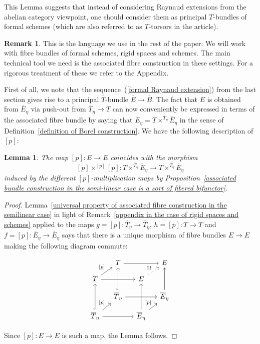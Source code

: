 \documentclass[10pt,oneside]{amsart}
\newtheorem{lemma}[theorem]{Lemma}
\theoremstyle{definition}
\newtheorem{remark}[theorem]{Remark}
\begin{document}
	This Lemma suggests that instead of considering Raynaud extensions from the abelian category viewpoint, one should consider them as principal $T$-bundles of formal schemes (which are also referred to as $T$-torsors in the article). 
	
	\begin{remark}
	This is the language we use in the rest of the paper: We will work with fibre bundles of formal schemes, rigid spaces and schemes. The main technical tool we need is the associated fibre construction in these settings. For a rigorous  treatment of these we refer to the Appendix.
	\end{remark}
	
	First of all, we note that the sequence~(\ref{formal Raynaud extension}) from the last section gives rise to a principal $\overline{T}$-bundle
	$\overline{E}\rightarrow \overline{B}$. The fact that $E$ is obtained from $\overline{E}_\eta$ via push-out from $\overline{T}_\eta\rightarrow T$ can now conveniently be expressed in terms of the associated fibre bundle by saying that $E_\eta = T\times^{\overline{T}_\eta}\overline{E}_\eta$ in the sense of Definition~\ref{definition of Borel construction}. We have the following description of $[p]$:
	\begin{lemma}\label{p-multiplication is induced from Borel construction}
		The map $[p]:E\rightarrow E$ coincides with the morphism 
		\[[p]\times^{[p]}[p]: T\times^{\overline{T}_\eta}\overline{E}_\eta\rightarrow T\times^{\overline{T}_\eta}\overline{E}_\eta\]
		induced by the different $[p]$-multiplication maps by Proposition~\ref{associated bundle construction in the semi-linear case is a sort of fibered bifunctor}.
	\end{lemma}
	\begin{proof}
		Lemma~\ref{universal property of associated fibre construction in the semilinear case} in light of Remark~\ref{appendix in the case of rigid spaces and schemes} applied to the maps $g=[p]:\overline{T}_\eta\rightarrow \overline{T}_\eta$, $h=[p]:T\rightarrow T$ and $f=[p]:\overline{E}_\eta\rightarrow \overline{E}_\eta$ says that there is a unique morphism of fibre bundles $E\rightarrow E$ making the following diagram commute:
		\begin{center}
			\begin{equation}\label{rigid p-multiplication cube}
			\begin{tikzcd}[row sep = small, column sep = small]
				& T \arrow[rr] &  & E \\
				T \arrow[ru, "{[p]}"] \arrow[rr,crossing over] &  & E \arrow[ru, "\exists!", dotted] &  \\
				& \overline{T}_\eta \arrow[uu, hook] \arrow[rr,crossing over] &  & \overline{E}_\eta \arrow[uu] \\
				\overline{T}_\eta \arrow[ru, "{[p]}"] \arrow[uu, hook] \arrow[rr] &  & \overline{E}_\eta \arrow[ru, "{[p]}"] \arrow[uu] & 
			\end{tikzcd}
			\end{equation}
		\end{center}
		Since $[p]:E\rightarrow E$ is such a map, the Lemma follows.
	\end{proof}
\end{document}

